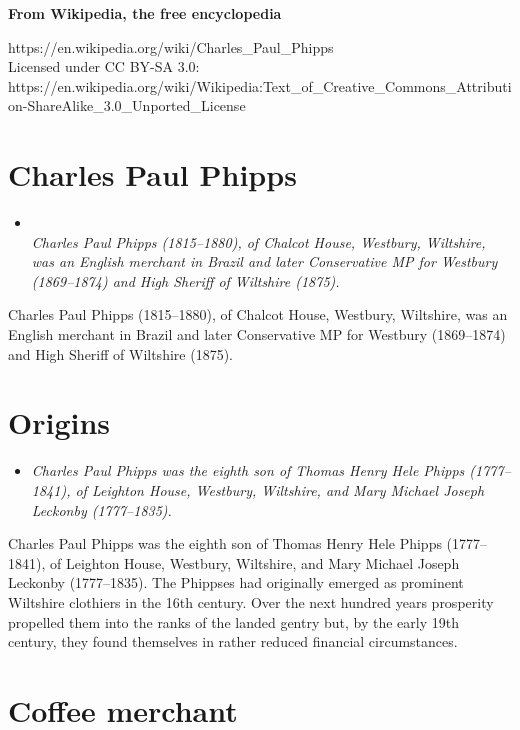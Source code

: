 \textbf{From Wikipedia, the free encyclopedia}

https://en.wikipedia.org/wiki/Charles\_Paul\_Phipps\\
Licensed under CC BY-SA 3.0:\\
https://en.wikipedia.org/wiki/Wikipedia:Text\_of\_Creative\_Commons\_Attribution-ShareAlike\_3.0\_Unported\_License

\section{Charles Paul Phipps}\label{charles-paul-phipps}

\begin{itemize}
\item
  \emph{\\
  Charles Paul Phipps (1815--1880), of Chalcot House, Westbury,
  Wiltshire, was an English merchant in Brazil and later Conservative MP
  for Westbury (1869--1874) and High Sheriff of Wiltshire (1875).}
\end{itemize}

Charles Paul Phipps (1815--1880), of Chalcot House, Westbury, Wiltshire,
was an English merchant in Brazil and later Conservative MP for Westbury
(1869--1874) and High Sheriff of Wiltshire (1875).

\section{Origins}\label{origins}

\begin{itemize}
\item
  \emph{Charles Paul Phipps was the eighth son of Thomas Henry Hele
  Phipps (1777--1841), of Leighton House, Westbury, Wiltshire, and Mary
  Michael Joseph Leckonby (1777--1835).}
\end{itemize}

Charles Paul Phipps was the eighth son of Thomas Henry Hele Phipps
(1777--1841), of Leighton House, Westbury, Wiltshire, and Mary Michael
Joseph Leckonby (1777--1835). The Phippses had originally emerged as
prominent Wiltshire clothiers in the 16th century. Over the next hundred
years prosperity propelled them into the ranks of the landed gentry but,
by the early 19th century, they found themselves in rather reduced
financial circumstances.

\section{Coffee merchant}\label{coffee-merchant}


